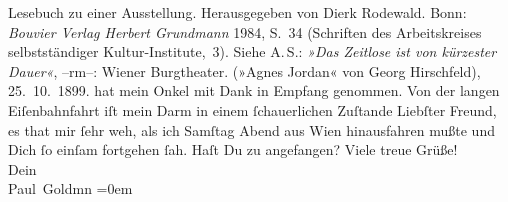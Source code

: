 \begin{ledgroupsized}[t]{13cm}
{{{{                        Lesebuch zu einer Ausstellung}. Herausgegeben von Dierk Rodewald.
                     Bonn: \emph{Bouvier Verlag Herbert
                        Grundmann}{ }1984, S. 34 (Schriften des Arbeitskreises
                              selbstständiger Kultur-Institute, 3). Siehe A. S.: \emph{»Das Zeitlose ist von kürzester Dauer«}, –rm–: Wiener Burgtheater. (»Agnes Jordan« von Georg Hirschfeld), 25. 10. 1899.
               }}}\label{K_L02891-2h} hat mein Onkel mit
               Dank in Empfang genommen.\pend
           \pstart
           Von der langen Eiſenbahnfahrt iſt mein Darm in einem ſchauerlichen Zuſtande{\dotsseven}\pend
           \pstart
           Liebſter Freund, es that mir ſehr weh, als ich Samſtag{ }Abend aus Wien hinausfahren mußte und
               Dich ſo einſam fortgehen ſah. Haſt Du zu \label{K_L02891-3v}\label{K_L02891-3h} angefangen?\pend
           \pstart
           Viele treue Grüße! {\\[\baselineskip]}Dein {\\[\baselineskip]}\spacefill\mbox{Paul Goldmn}\pend
           \leftskip=0em{}
         
         \endnumbering{}\end{ledgroupsized}  \newcommand{\dateiname}{L02891}\newcommand{\titel}{Paul Goldmann an Arthur Schnitzler, 23. 10. [1899]}\newcommand{\editorInnen}{Martin Anton Müller und Laura Untner}
      